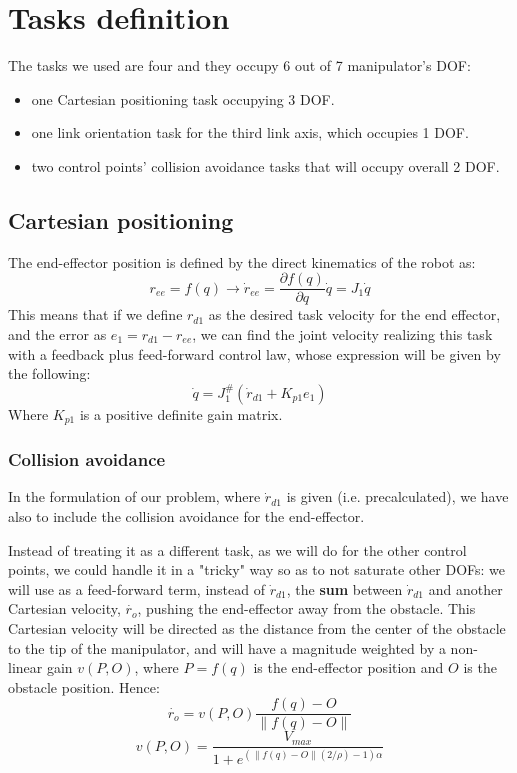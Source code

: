 \documentclass[12pt, a4paper]{article}
\newcommand{\diff}[2]{\frac{\partial{#1}}{\partial{#2}}}
\begin{document}
\section{Tasks definition}
The tasks we used are four and they occupy 6 out of 7 manipulator's DOF:
\begin{itemize}
	\item one Cartesian positioning task occupying 3 DOF.
	\item one link orientation task for the third link axis, which occupies 1 DOF.
	\item two control points' collision avoidance tasks that will occupy overall 2 DOF.
\end{itemize}
\subsection[Task 1]{Cartesian positioning}
The end-effector position is defined by the direct kinematics of the robot as:
\[
r_{ee} = f(q) \rightarrow \dot{r}_{ee} = \diff{f(q)}{q}\dot{q} = J_1\dot{q}
\]
This means that if we define $r_{d1}$ as the desired task velocity for the end effector, and the error as $e_1 = r_{d1} - r_{ee}$, we can find the joint velocity realizing this task with a feedback plus feed-forward control law, whose expression will be given by the following:
\begin{equation}
\label{EQN: task1}
\dot{q} = J_1^{\#}(\dot{r}_{d1} + K_{p1}e_1)
\end{equation}
Where $K_{p1}$ is a positive definite gain matrix.
\subsubsection{Collision avoidance}
In the formulation of our problem, where $\dot{r}_{d1}$ is given (i.e. precalculated), we have also to include the collision avoidance for the end-effector. 

Instead of treating it as a different task, as we will do for the other control points, we could handle it in a "tricky" way so as to not saturate other DOFs: we will use as a feed-forward term, instead of $\dot{r}_{d1}$, the \textbf{sum} between $\dot{r}_{d1}$ and another Cartesian velocity, $\dot{r_o}$, pushing the end-effector away from the obstacle. This Cartesian velocity will be directed as the distance from the center of the obstacle to the tip of the manipulator, and will have a magnitude weighted by a non-linear gain $v(P,O)$, where $P = f(q)$ is the end-effector position and $O$ is the obstacle position.
Hence:
\begin{equation}\label{repulsive_dir}
\dot{r_o} = v(P,O)\frac{f(q) - O}{\lVert f(q) - O \rVert}
\end{equation}
\begin{equation}\label{repulsive_mag}
v(P,O) = \frac{V_{max}}{1+e^{(\lVert f(q) -O \rVert(2/\rho)-1)\alpha}}
\end{equation}
\end{document}
